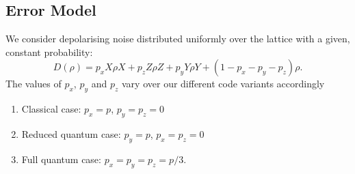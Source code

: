 




\subsection{Error Model}

We consider depolarising noise distributed uniformly over the lattice with a given, constant probability:
\begin{equation} \label{noise_eq}
  D(\rho) = p_x X\rho X +  p_z Z\rho Z + p_y Y\rho Y  + (1- p_x - p_y - p_z)\rho.
\end{equation}
The values of $p_x$, $p_y$ and $p_z$ vary over our different code variants accordingly
\begin{enumerate}
  \item Classical case: $p_x = p$, $p_y = p_z = 0$
  \item Reduced quantum case: $p_y = p$, $p_x = p_z = 0$
  \item Full quantum case: $p_x = p_y = p_z = p/3$.
\end{enumerate}

